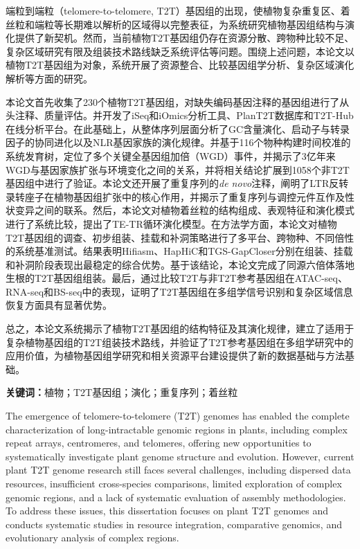 \cleardoublepage
{}

端粒到端粒（telomere-to-telomere, T2T）基因组的出现，使植物复杂重复区、着丝粒和端粒等长期难以解析的区域得以完整表征，为系统研究植物基因组结构与演化提供了新契机。然而，当前植物T2T基因组仍存在资源分散、跨物种比较不足、复杂区域研究有限及组装技术路线缺乏系统评估等问题。围绕上述问题，本论文以植物T2T基因组为对象，系统开展了资源整合、比较基因组学分析、复杂区域演化解析等方面的研究。

本论文首先收集了230个植物T2T基因组，对缺失编码基因注释的基因组进行了从头注释、质量评估。并开发了iSeq和iOmics分析工具、PlanT2T数据库和T2T-Hub在线分析平台。在此基础上，从整体序列层面分析了GC含量演化、启动子与转录因子的协同进化以及NLR基因家族的演化规律。并基于116个物种构建时间校准的系统发育树，定位了多个关键全基因组加倍（WGD）事件，并揭示了3亿年来WGD与基因家族扩张与环境变化之间的关系，并将相关结论扩展到1058个非T2T基因组中进行了验证。本论文还开展了重复序列的\textit{de novo}注释，阐明了LTR反转录转座子在植物基因组扩张中的核心作用，并揭示了重复序列与调控元件互作及性状变异之间的联系。然后，本论文对植物着丝粒的结构组成、表观特征和演化模式进行了系统比较，提出了TE-TR循环演化模型。在方法学方面，本论文对植物T2T基因组的调查、初步组装、挂载和补洞策略进行了多平台、跨物种、不同倍性的系统基准测试。结果表明Hifiasm、HapHiC和TGS-GapCloser分别在组装、挂载和补洞阶段表现出最稳定的综合优势。基于该结论，本论文完成了同源六倍体落地生根的T2T基因组组装。最后，通过比较T2T与非T2T参考基因组在ATAC-seq、RNA-seq和BS-seq中的表现，证明了T2T基因组在多组学信号识别和复杂区域信息恢复方面具有显著优势。

总之，本论文系统揭示了植物T2T基因组的结构特征及其演化规律，建立了适用于复杂植物基因组的T2T组装技术路线，并验证了T2T参考基因组在多组学研究中的应用价值，为植物基因组学研究和相关资源平台建设提供了新的数据基础与方法基础。

\noindent\textbf{关键词：}植物；T2T基因组；演化；重复序列；着丝粒

\cleardoublepage
{}

The emergence of telomere-to-telomere (T2T) genomes has enabled the complete characterization of long-intractable genomic regions in plants, including complex repeat arrays, centromeres, and telomeres, offering new opportunities to systematically investigate plant genome structure and evolution. However, current plant T2T genome research still faces several challenges, including dispersed data resources, insufficient cross-species comparisons, limited exploration of complex genomic regions, and a lack of systematic evaluation of assembly methodologies. To address these issues, this dissertation focuses on plant T2T genomes and conducts systematic studies in resource integration, comparative genomics, and evolutionary analysis of complex regions.


